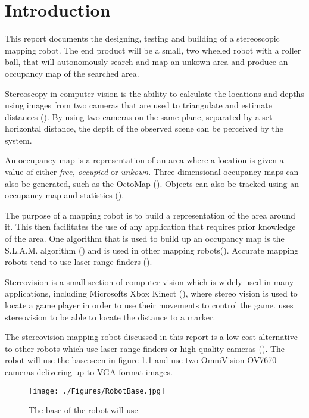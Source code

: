 \chapter{Introduction} \label{Chapter:Introduction}

%
%
%
%


This report documents the designing, testing and building of a stereoscopic mapping robot. The end product will be a small, two wheeled robot with a roller ball, that will autonomously search and map an unkown area and produce an occupancy map of the searched area. 

Stereoscopy in computer vision is the ability to calculate the locations and depths using images from two cameras that are used to triangulate and estimate distances (\cite{Saxena:DepthEstimation}). By using two cameras on the same plane, separated by a set horizontal distance, the depth of the observed scene can be perceived by the system.

An occupancy map is a representation of an area where a location is given a value of either \textit{free, occupied} or \textit{unkown}\cite{thrun2003learning}.  Three dimensional occupancy maps can also be generated, such as the OctoMap (\cite{octomap}). Objects can also be tracked using an occupancy map and statistics (\cite{Fleuret:OccupancyMap}). 

The purpose of a mapping robot is to build a representation of the area around it. This then facilitates the use of any application that requires prior knowledge of the area. One algorithm that is used to build up an occupancy map is the S.L.A.M. algorithm (\cite{Thrun:SLAM}) and is used in other mapping robots(\cite{Se:MappingRobot}). Accurate mapping robots tend to use laser range finders (\cite{Ruhnke:LaserMapping}).

Stereovision is a small section of computer vision which is widely used in many applications, including Microsofts Xbox Kinect (\cite{Microsoft:Kinect}), where stereo vision is used to locate a game player in order to use their movements to control the game. \cite{Mrovlje:Distance_Stereoscopic} uses stereovision to be able to locate the distance to a marker.

The stereovision mapping robot discussed in this report is a low cost alternative to other robots which use laser range finders or high quality cameras (\cite{Se:MappingRobot}). The robot will use the base seen in figure \ref{fig:RobotBase} and use two OmniVision OV7670 cameras delivering up to VGA format images.

\begin{figure}
\texttt{[image: ./Figures/RobotBase.jpg]}
\caption{The base of the robot will use}
\label{fig:RobotBase}
\end{figure}